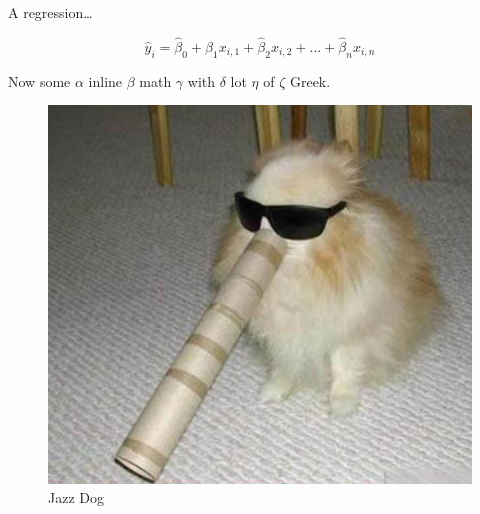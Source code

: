 \documentclass[
                ]
{article}
\begin{document}
A regression\ldots{}

\[
\hat{y}_i = \hat{\beta}_0 + \hat{\beta}_1 x_{i,1} + \hat{\beta}_2 x_{i,2} + ... + \hat{\beta}_n x_{i,n}
\]

Now some \(\alpha\) inline \(\beta\) math \(\gamma\) with \(\delta\) lot
\(\eta\) of \(\zeta\) Greek.

\begin{figure}
\centering
\includegraphics{./jazz_dog.jpeg}
\caption{Jazz Dog}
\end{figure}
\end{document}

